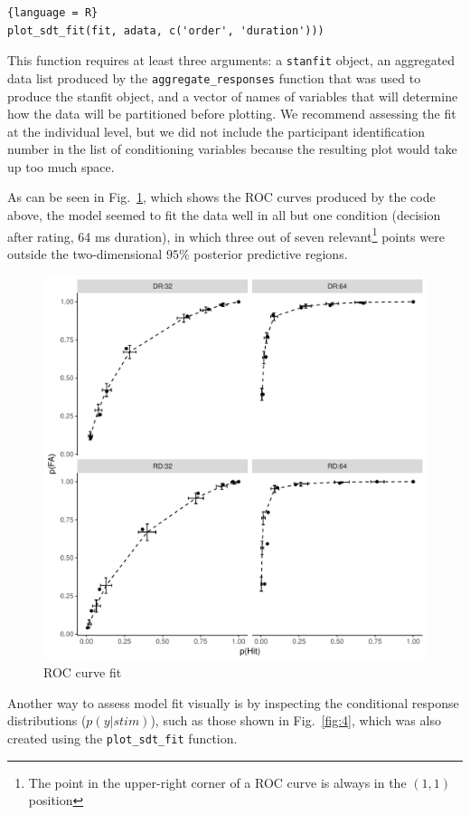 \documentclass[a4paper,man,apacite,floatsintext]{apa6}
\newcommand{\code}[1]{\texttt{#1}}
\begin{document}
\begin{lstlisting}{language = R}
plot_sdt_fit(fit, adata, c('order', 'duration')))
\end{lstlisting}

This function requires at least three arguments: a \code{stanfit}
object, an aggregated data list produced by the
\code{aggregate\_responses} function that was used to produce the
stanfit object, and a vector of names of variables that will determine
how the data will be partitioned before plotting. We recommend
assessing the fit at the individual level, but we did not include the
participant identification number in the list of conditioning
variables because the resulting plot would take up too much space.

As can be seen in Fig.~\ref{fig:3}, which shows the ROC curves
produced by the code above, the model seemed to fit the data well in
all but one condition (decision after rating, 64 ms duration), in
which three out of seven relevant\footnote{The point in the
  upper-right corner of a ROC curve is always in the $(1,1)$ position}
points were outside the two-dimensional $95\%$ posterior predictive
regions.

\begin{figure}[H]
  \centering
  \includegraphics[width=.8\linewidth]{roc_fit.pdf}
  \caption{ROC curve fit}
  \label{fig:3}
\end{figure}

Another way to assess model fit visually is by inspecting the
conditional response distributions ($p(y|stim)$), such as those shown
in Fig.~\ref{fig:4}, which was also created using the
\code{plot\_sdt\_fit} function.
\end{document}
